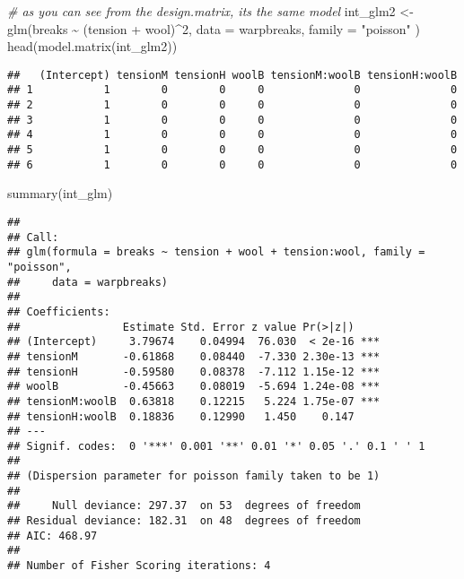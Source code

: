 \documentclass[
  oneside]{book}
\newenvironment{Shaded}{\begin{snugshade}}{\end{snugshade}}
\newcommand{\AttributeTok}[1]{\textcolor[rgb]{0.77,0.63,0.00}{#1}}
\newcommand{\CommentTok}[1]{\textcolor[rgb]{0.56,0.35,0.01}{\textit{#1}}}
\newcommand{\DecValTok}[1]{\textcolor[rgb]{0.00,0.00,0.81}{#1}}
\newcommand{\FunctionTok}[1]{\textcolor[rgb]{0.00,0.00,0.00}{#1}}
\newcommand{\NormalTok}[1]{#1}
\newcommand{\OtherTok}[1]{\textcolor[rgb]{0.56,0.35,0.01}{#1}}
\newcommand{\SpecialCharTok}[1]{\textcolor[rgb]{0.00,0.00,0.00}{#1}}
\newcommand{\StringTok}[1]{\textcolor[rgb]{0.31,0.60,0.02}{#1}}
\begin{document}
\begin{Shaded}
\begin{Highlighting}[]
\CommentTok{\# as you can see from the design.matrix, it\textquotesingle{}s the same model}
\NormalTok{int\_glm2 }\OtherTok{\textless{}{-}} \FunctionTok{glm}\NormalTok{(breaks }\SpecialCharTok{\textasciitilde{}}\NormalTok{ (tension }\SpecialCharTok{+}\NormalTok{ wool)}\SpecialCharTok{\^{}}\DecValTok{2}\NormalTok{,}
  \AttributeTok{data =}\NormalTok{ warpbreaks, }\AttributeTok{family =} \StringTok{"poisson"}
\NormalTok{)}
\FunctionTok{head}\NormalTok{(}\FunctionTok{model.matrix}\NormalTok{(int\_glm2))}
\end{Highlighting}
\end{Shaded}

\begin{verbatim}
##   (Intercept) tensionM tensionH woolB tensionM:woolB tensionH:woolB
## 1           1        0        0     0              0              0
## 2           1        0        0     0              0              0
## 3           1        0        0     0              0              0
## 4           1        0        0     0              0              0
## 5           1        0        0     0              0              0
## 6           1        0        0     0              0              0
\end{verbatim}

\begin{Shaded}
\begin{Highlighting}[]
\FunctionTok{summary}\NormalTok{(int\_glm)}
\end{Highlighting}
\end{Shaded}

\begin{verbatim}
## 
## Call:
## glm(formula = breaks ~ tension + wool + tension:wool, family = "poisson", 
##     data = warpbreaks)
## 
## Coefficients:
##                Estimate Std. Error z value Pr(>|z|)    
## (Intercept)     3.79674    0.04994  76.030  < 2e-16 ***
## tensionM       -0.61868    0.08440  -7.330 2.30e-13 ***
## tensionH       -0.59580    0.08378  -7.112 1.15e-12 ***
## woolB          -0.45663    0.08019  -5.694 1.24e-08 ***
## tensionM:woolB  0.63818    0.12215   5.224 1.75e-07 ***
## tensionH:woolB  0.18836    0.12990   1.450    0.147    
## ---
## Signif. codes:  0 '***' 0.001 '**' 0.01 '*' 0.05 '.' 0.1 ' ' 1
## 
## (Dispersion parameter for poisson family taken to be 1)
## 
##     Null deviance: 297.37  on 53  degrees of freedom
## Residual deviance: 182.31  on 48  degrees of freedom
## AIC: 468.97
## 
## Number of Fisher Scoring iterations: 4
\end{verbatim}
\end{document}
